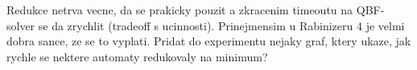 \documentclass[a4paper,UKenglish,cleveref, autoref, thm-restate]{lipics-v2021}
\begin{document}
Redukce netrva vecne, da se prakicky pouzit a zkracenim timeoutu na
QBF-solver se da zrychlit (tradeoff s ucinnosti). Prinejmensim u
Rabinizeru 4 je velmi dobra sance, ze se to vyplati. Pridat do
experimentu nejaky graf, ktery ukaze, jak rychle se nektere automaty
redukovaly na minimum?


%

\end{document}
